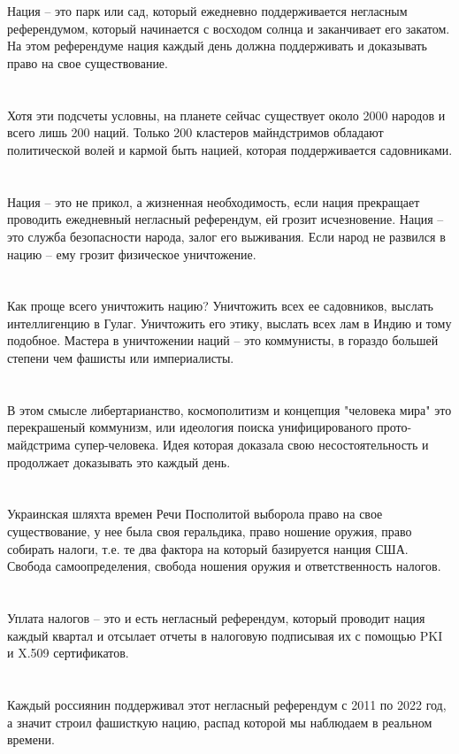\\
\\
Нация -- это парк или сад, который ежедневно поддерживается негласным референдумом, который начинается с восходом солнца и заканчивает его закатом. На этом референдуме нация каждый день должна поддерживать и доказывать право на свое существование.\\
\\
\\
Хотя эти подсчеты условны, на планете сейчас существует около 2000 народов и всего лишь 200 наций. Только 200 кластеров майндстримов обладают политической волей и кармой быть нацией, которая поддерживается садовниками.\\
\\
\\
Нация -- это не прикол, а жизненная необходимость, если нация прекращает проводить ежедневный негласный референдум, ей грозит исчезновение. Нация -- это служба безопасности народа, залог его выживания. Если народ не развился в нацию -- ему грозит физическое уничтожение.\\
\\
\\
Как проще всего уничтожить нацию? Уничтожить всех ее садовников, выслать интеллигенцию в Гулаг. Уничтожить его этику, выслать всех лам в Индию и тому подобное. Мастера в уничтожении наций -- это коммунисты, в гораздо большей степени чем фашисты или империалисты.\\
\\
\\
В этом смысле либертарианство, космополитизм и концепция "человека мира" это перекрашеный коммунизм, или идеология поиска унифицированого прото-майдстрима супер-человека. Идея которая доказала свою несостоятельность и продолжает доказывать это каждый день.\\
\\
\\
Украинская шляхта времен Речи Посполитой выборола право на свое существование, у нее была своя геральдика, право ношение оружия, право собирать налоги, т.е. те два фактора на который базируется нанция США. Свобода самоопределения, свобода ношения оружия и ответственность налогов.\\
\\
\\
Уплата налогов -- это и есть негласный референдум, который проводит нация каждый квартал и отсылает отчеты в налоговую подписывая их с помощью PKI и X.509 сертификатов.\\
\\
\\
Каждый россиянин поддерживал этот негласный референдум с 2011 по 2022 год, а значит строил фашисткую нацию, распад которой мы наблюдаем в реальном времени.\\

